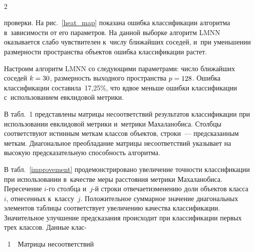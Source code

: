 \pagebreak



\begin{figure*} %
\vspace*{1pt}
 \begin{center}
 \mbox{%
 \epsfxsize=109.202mm
 }
 \end{center}
 \vspace*{-9pt}
\label{heat_map}
\vspace*{9pt}
\end{figure*}


\begin{multicols}{2}

 

\noindent
 про\-вер\-ки.
На рис.~\ref{heat_map} показана ошибка классификации алгоритма 
в~зависимости от его параметров.
На данной выборке алгоритм LMNN оказывается слабо чувствителен 
к~числу ближайших соседей,
и~при уменьшении размерности пространства объектов ошибка классификации растет.


Настроим алгоритм LMNN со следующими параметрами: число 
ближайших соседей $k \hm= 30$, размерность
выходного пространства $p \hm= 128$.
Ошибка
 классификации составила~17,25\%, что вдвое меньше ошибки классификации 
с~использованием евклидовой метрики.


В табл.~1 представлены матрицы несоответствий 
результатов классификации при использовании
евклидовой метрики и~метрики Махаланобиса.
Столбцы соответствуют истинным меткам классов объектов, 
строки~--- предсказанным меткам.
Диагональное преобладание матрицы несоответствий указывает на 
высокую предсказательную способность алгоритма.

В табл.~\ref{improvement} продемонстрировано увеличение точности классификации 
при использовании в~качестве меры расстояния метрики Махаланобиса.
Пересече\-ние $i$-го столбца и~$j$-й строки отвечает\linebreak изменению доли объектов класса~$i$, 
отнесенных к~классу~$j$. Положительное суммарное значе\-ние диагональных элементов 
таблицы соответствует увеличению качества классификации. Значительное улучшение 
предсказания происходит при классификации первых трех классов.
Данные клас-\linebreak

\noindent
 \begin{center}  %
 \vspace*{-12pt}
{{\tablename~1}\ \ \small{Матрицы несоответствий}}


\end{center}
\end{multicols}
